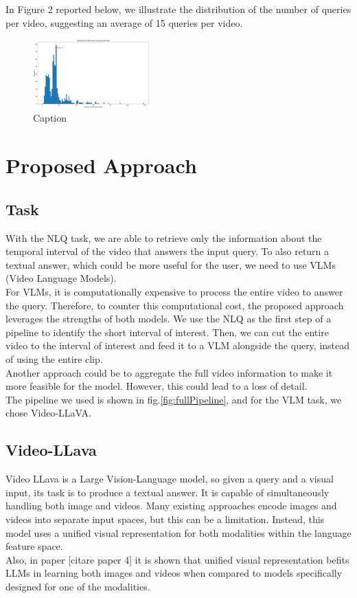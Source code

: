 \documentclass[conference]{IEEEtran}
\begin{document}
In Figure 2 reported below, we illustrate the distribution of the number of queries per video, suggesting an average of 15 queries per video.

\begin{figure}[h]
\centering
\includegraphics[width=0.4\textwidth]{Figure2.pdf} %
\caption{Caption}
\label{fig:figure2}
\end{figure}

\section{Proposed Approach}
\subsection{Task}
With the NLQ task, we are able to retrieve only the information about the temporal interval of the video that answers the input query. To also return a textual answer, which could be more useful for the user, we need to use VLMs (Video Language Models).\\

For VLMs, it is computationally expensive to process the entire video to answer the query. Therefore, to counter this computational cost, the proposed approach leverages the strengths of both models. We use the NLQ as the first step of a pipeline to identify the short interval of interest. Then, we can cut the entire video to the interval of interest and feed it to a VLM alongside the query, instead of using the entire clip.\\

Another approach could be to aggregate the full video information to make it more feasible for the model. However, this could lead to a loss of detail.\\

The pipeline we used is shown in fig.\ref{fig:fullPipeline}, and for the VLM task, we chose Video-LLaVA.

\subsection{Video-LLava}
Video LLava is a Large Vision-Language model, so given a query and a visual input, its task is to produce a textual answer.  It is capable of simultaneously handling both image and videos. Many existing approaches encode images and videos into separate input spaces, but this can be a limitation. Instead, this model uses a unified visual representation for both modalities within the language feature space.\\
Also, in paper [citare paper 4] it is shown that unified visual representation befits LLMs in learning both images and videos when compared to models specifically designed for one of the modalities.
\end{document}
